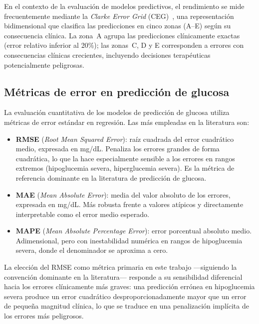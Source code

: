En el contexto de la evaluación de modelos predictivos, el rendimiento se mide frecuentemente mediante la \emph{Clarke Error Grid} (CEG)~\cite{clarke1987evaluating}, una representación bidimensional que clasifica las predicciones en cinco zonas (A--E) según su consecuencia clínica. La zona~A agrupa las predicciones clínicamente exactas (error relativo inferior al 20\%); las zonas~C, D y E corresponden a errores con consecuencias clínicas crecientes, incluyendo decisiones terapéuticas potencialmente peligrosas.

\subsection{Métricas de error en predicción de glucosa}
\label{subsec:metricas_error}

La evaluación cuantitativa de los modelos de predicción de glucosa utiliza métricas de error estándar en regresión. Las más empleadas en la literatura son:

\begin{itemize}
    \item \textbf{RMSE} (\emph{Root Mean Squared Error}): raíz cuadrada del error cuadrático medio, expresada en mg/dL. Penaliza los errores grandes de forma cuadrática, lo que la hace especialmente sensible a los errores en rangos extremos (hipoglucemia severa, hiperglucemia severa). Es la métrica de referencia dominante en la literatura de predicción de glucosa.
    \item \textbf{MAE} (\emph{Mean Absolute Error}): media del valor absoluto de los errores, expresada en mg/dL. Más robusta frente a valores atípicos y directamente interpretable como el error medio esperado.
    \item \textbf{MAPE} (\emph{Mean Absolute Percentage Error}): error porcentual absoluto medio. Adimensional, pero con inestabilidad numérica en rangos de hipoglucemia severa, donde el denominador se aproxima a cero.
\end{itemize}

La elección del RMSE como métrica primaria en este trabajo —siguiendo la convención dominante en la literatura— responde a su sensibilidad diferencial hacia los errores clínicamente más graves: una predicción errónea en hipoglucemia severa produce un error cuadrático desproporcionadamente mayor que un error de pequeña magnitud clínica, lo que se traduce en una penalización implícita de los errores más peligrosos.

